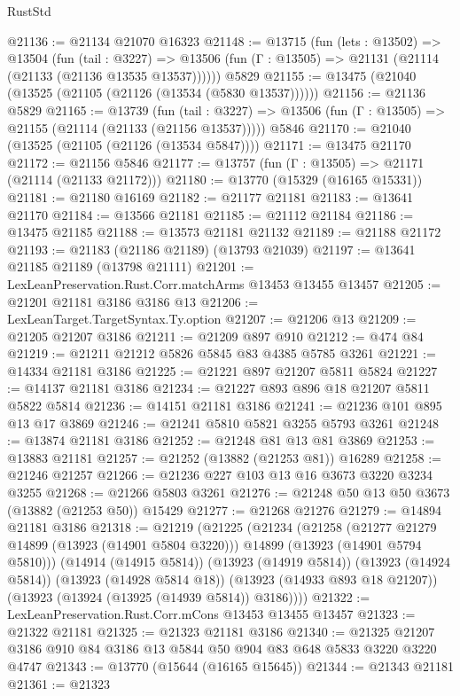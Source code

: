 \begin{lexlean}{RustStd}
\begin{coremodule}
@21136 := @21134 @21070 @16323
@21148 := @13715
    (fun (lets : @13502) =>
    @13504
      (fun (tail : @3227) =>
      @13506 (fun (Γ : @13505) => @21131 (@21114 (@21133 (@21136 @13535 @13537))))))
    @5829
@21155 := @13475 (@21040 (@13525 (@21105 (@21126 (@13534 (@5830 @13537))))))
@21156 := @21136 @5829
@21165 := @13739
    (fun (tail : @3227) => @13506 (fun (Γ : @13505) => @21155 (@21114 (@21133 (@21156 @13537)))))
    @5846
@21170 := @21040 (@13525 (@21105 (@21126 (@13534 @5847))))
@21171 := @13475 @21170
@21172 := @21156 @5846
@21177 := @13757 (fun (Γ : @13505) => @21171 (@21114 (@21133 @21172)))
@21180 := @13770 (@15329 (@16165 @15331))
@21181 := @21180 @16169
@21182 := @21177 @21181
@21183 := @13641 @21170
@21184 := @13566 @21181
@21185 := @21112 @21184
@21186 := @13475 @21185
@21188 := @13573 @21181 @21132
@21189 := @21188 @21172
@21193 := @21183 (@21186 @21189) (@13793 @21039)
@21197 := @13641 @21185 @21189 (@13798 @21111)
@21201 := LexLeanPreservation.Rust.Corr.matchArms @13453 @13455 @13457
@21205 := @21201 @21181 @3186 @3186 @13
@21206 := LexLeanTarget.TargetSyntax.Ty.option
@21207 := @21206 @13
@21209 := @21205 @21207 @3186
@21211 := @21209 @897 @910
@21212 := @474 @84
@21219 := @21211 @21212 @5826 @5845 @83 @4385 @5785 @3261
@21221 := @14334 @21181 @3186
@21225 := @21221 @897 @21207 @5811 @5824
@21227 := @14137 @21181 @3186
@21234 := @21227 @893 @896 @18 @21207 @5811 @5822 @5814
@21236 := @14151 @21181 @3186
@21241 := @21236 @101 @895 @13 @17 @3869
@21246 := @21241 @5810 @5821 @3255 @5793 @3261
@21248 := @13874 @21181 @3186
@21252 := @21248 @81 @13 @81 @3869
@21253 := @13883 @21181
@21257 := @21252 (@13882 (@21253 @81)) @16289
@21258 := @21246 @21257
@21266 := @21236 @227 @103 @13 @16 @3673 @3220 @3234 @3255
@21268 := @21266 @5803 @3261
@21276 := @21248 @50 @13 @50 @3673 (@13882 (@21253 @50)) @15429
@21277 := @21268 @21276
@21279 := @14894 @21181 @3186
@21318 := @21219
    (@21225
      (@21234
        (@21258
          (@21277 @21279 @14899 (@13923 (@14901 @5804 @3220)))
          @14899
          (@13923 (@14901 @5794 @5810)))
        (@14914 (@14915 @5814))
        (@13923 (@14919 @5814))
        (@13923 (@14924 @5814))
        (@13923 (@14928 @5814 @18))
        (@13923 (@14933 @893 @18 @21207))
        (@13923 (@13924 (@13925 (@14939 @5814)) @3186))))
@21322 := LexLeanPreservation.Rust.Corr.mCons @13453 @13455 @13457
@21323 := @21322 @21181
@21325 := @21323 @21181 @3186
@21340 := @21325 @21207 @3186 @910 @84 @3186 @13 @5844 @50 @904 @83 @648 @5833 @3220 @3220 @4747
@21343 := @13770 (@15644 (@16165 @15645))
@21344 := @21343 @21181
@21361 := @21323

\end{coremodule}
\end{lexlean}
